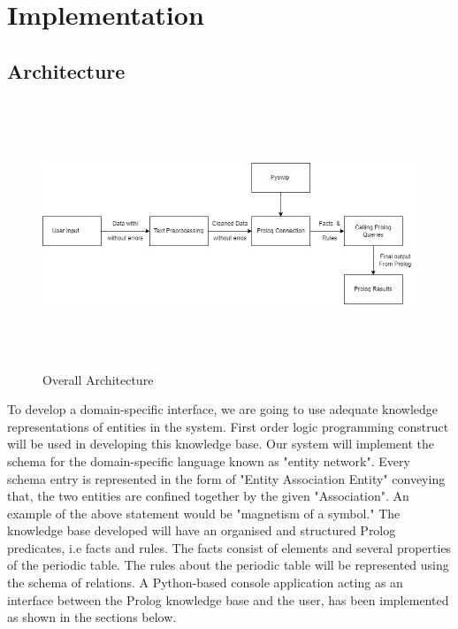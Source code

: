 \documentclass{article}
\begin{document}
\section{Implementation}
\subsection{Architecture}

\begin{figure}[ht]
    \centering
    \includegraphics[width=15cm, height = 8cm]{Images/Architecture.jpg}
    \caption{Overall Architecture}
    \label{fig:Overall Architecture}
\end{figure}

To develop a domain-specific interface, we are going to use adequate knowledge representations of entities in the system.\cite{rohil2018natural} First order logic programming construct will be used in developing this knowledge base. Our system will implement the schema for the domain-specific language known as "entity network". Every schema entry is represented in the form of "Entity Association Entity" conveying that, the two entities are confined together by the given "Association".\cite{baeldungFirstOrderLogic} An example of the above statement would be "magnetism of a symbol." The knowledge base developed will have an organised and structured Prolog predicates, i.e facts and rules. The facts consist of elements and several properties of the periodic table. The rules about the periodic table will be represented using the schema of relations. A Python-based console application\cite{pypi} acting as an interface between the Prolog knowledge base and the user, has been implemented as shown in the sections below.
\end{document}
